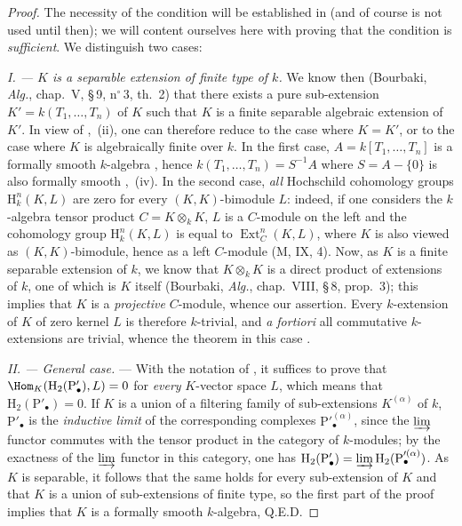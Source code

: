 \begin{proof}
The necessity of the condition will be established in  (and of course is not used until then);
we will content ourselves here with proving that the condition is \emph{sufficient}.
We distinguish two cases:

\emph{I. --- $K$ is a separable extension of finite type of $k$.}
We know then (Bourbaki, \emph{Alg.}, chap.~V, \S\,9, n$^\circ$\,3, th.~2) that there exists a pure sub-extension $K'=k(T_1,\ldots,T_n)$ of $K$ such that $K$ is a finite separable algebraic extension of $K'$.
In view of ,~(ii), one can therefore reduce to the case where $K=K'$, or to the case where $K$ is algebraically finite over $k$.
In the first case, $A=k[T_1,\ldots,T_n]$ is a formally smooth $k$-algebra , hence $k(T_1,\ldots,T_n)=S^{-1}A$ where $S=A-\{0\}$ is also formally smooth ,~(iv).
In the second case, \emph{all} Hochschild cohomology groups $\mathrm{H}^n_k(K,L)$ are zero for every $(K,K)$-bimodule $L$:
indeed, if one considers the $k$-algebra tensor product $C=K\otimes_k K$, $L$ is a $C$-module on the left and the cohomology group $\mathrm{H}^n_k(K,L)$ is equal to $\operatorname{Ext}^n_C(K,L)$, where $K$ is also viewed as $(K,K)$-bimodule,
hence as a left $C$-module (M, IX, 4).
Now, as $K$ is a finite separable extension of $k$, we know that $K\otimes_k K$ is a direct product of extensions of $k$, one of which is $K$ itself (Bourbaki, \emph{Alg.}, chap.~VIII, \S\,8, prop.~3);
this implies that $K$ is a \emph{projective} $C$-module, whence our assertion.
Every $k$-extension of $K$ of zero kernel $L$ is therefore $k$-trivial, and \emph{a fortiori} all commutative $k$-extensions are trivial, whence the theorem in this case .

\emph{II. --- General case.} ---
With the notation of , it suffices to prove that $\Hom_K(\mathrm{H}_2(\mathrm{P}'_\bullet),L)=0$ for \emph{every} $K$-vector space $L$, which means that $\mathrm{H}_2(\mathrm{P}'_\bullet)=0$.
If $K$ is a union of a filtering family of sub-extensions $K^{(\alpha)}$ of $k$, $\mathrm{P}'_\bullet$ is the \emph{inductive limit} of the corresponding complexes $\mathrm{P}'^{(\alpha)}_\bullet$, since the $\varinjlim$ functor commutes with the tensor product in the category of $k$-modules;
by the exactness of the $\varinjlim$ functor in this category, one has $\mathrm{H}_2(\mathrm{P}'_\bullet)=\varinjlim\mathrm{H}_2(\mathrm{P}'^{(\alpha)}_\bullet)$.
As $K$ is separable, it follows that the same holds for every sub-extension of $K$ and that $K$ is a union of sub-extensions of finite type, so the first part of the proof implies that $K$ is a formally smooth $k$-algebra, Q.E.D.
\end{proof}

